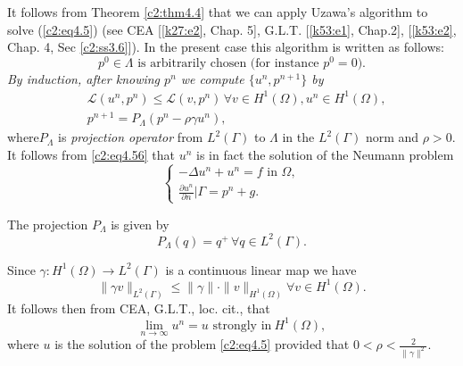 It follows from Theorem \ref{c2:thm4.4} that we can apply Uzawa's algorithm to
solve (\ref{c2:eq4.5}) (see CEA [\ref{k27:e2}, Chap. 5],
G.L.T. [\ref{k53:e1}, Chap.2], [\ref{k53:e2}, Chap. 4,
  Sec \ref{c2:ss3.6}]). In the present case this algorithm is written as follows:  
\begin{equation}
p^0 \in \Lambda  \text{ is arbitrarily chosen (for instance } p^0
= 0). \tag{4.55}\label{c2:eq4.55} 
\end{equation}
\textit{By induction, after knowing $p^n$ we compute $\{u^n,
  p^{n+1}\}$  by} 
\begin{align}
& \mathscr{L} (u^n, p^n) \leq \mathscr{L} (v, p^n)\, \forall  v \in
  H^1 (\Omega), u^n \in H^1 (\Omega), \tag{4.56}\label{c2:eq4.56}\\ 
& p^{n+1} = P_\Lambda  (p^n-\rho \gamma u^n), \tag{4.57}\label{c2:eq4.57}
\end{align}
where\pageoriginale  $P_\Lambda$ is \textit{projection operator} from $L^2(\Gamma)$
to $\Lambda$ in the $L^2(\Gamma)$ norm and $\rho > 0$. It follows from
\eqref{c2:eq4.56} that $u^n$ is in fact the solution of the Neumann
problem   
\begin{equation}
\begin{cases}
-\Delta u^n + u^n = f \text{ in } \Omega,\\
\frac{\partial u^n}{\partial n}| \Gamma = p^n + g. \tag{4.58}\label{c2:eq4.58}
\end{cases}
\end{equation}

The projection $P_\Lambda  $ is given by  
\begin{equation}
P_\Lambda  (q) = q^+\, \forall  q \in L^2
(\Gamma). \tag{4.59}\label{c2:eq4.59}  
\end{equation}

Since $\gamma : H^1 (\Omega) \to L^2(\Gamma)$ is a continuous linear
map we have  
\begin{equation}
\parallel \gamma v\parallel_{L^2(\Gamma)} \leq \parallel \gamma\parallel \cdot \parallel v\parallel_{H^1(\Omega)}
\forall v \in H^1(\Omega).\tag{4.60}\label{c2:eq4.60}  
\end{equation}
It follows then from CEA, G.L.T., loc. cit., that 
\begin{equation}
\lim_{n \to \infty} u^n = u \text{ strongly in}~ H^1 (\Omega),
\tag{4.61}\label{c2:eq4.61} 
\end{equation}
where $u$ is the solution of the problem \eqref{c2:eq4.5}  provided that $0 <
\rho < \frac{2}{\parallel \gamma\parallel^2}$.  

